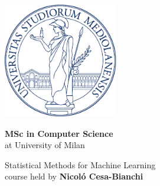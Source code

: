 \documentclass[a4paper]{article}
\begin{document}


\begin{titlepage}
    \begin{center}
        \includegraphics[height=5cm]{minerva.pdf} %

        \vspace*{1.75cm}

        \LARGE


        \textbf{MSc in Computer Science} \\
        at University of Milan

        \vspace*{1cm}

        
        \huge
        Statistical Methods for Machine Learning\\
        
        \large course held by \textbf{Nicoló Cesa-Bianchi}
        

        \normalsize
        \vspace*{4cm}


\end{center}
\end{titlepage}
\end{document}
